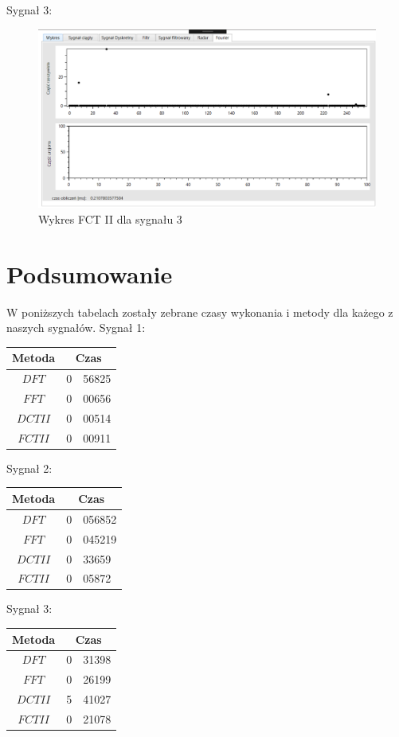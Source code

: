 \documentclass[12pt]{article}
\begin{document}
\newpage
Sygnał 3:
\begin{figure}[h!]
 \centering
 \includegraphics[width=12.3cm]{s18FCT2.PNG}
 \vspace{-0.3cm}
 \caption{Wykres FCT II dla sygnału 3}
 \label{Wykres dla wyników eksperymentu pierwszego}
\end{figure}


\section{Podsumowanie}
W poniższych tabelach zostały zebrane czasy wykonania i metody dla każego z naszych sygnałów.
Sygnał 1:
\begin{tabular}{c r @{,} l}
Metoda &
\multicolumn{2}{c}{Czas}\\ \hline
$DFT$ & 0&56825 \\
$FFT$ & 0&00656 \\
$DCT II$ & 0&00514 \\
$FCT II$ & 0&00911 \\
\end{tabular}

Sygnał 2:
\begin{tabular}{c r @{,} l}
Metoda &
\multicolumn{2}{c}{Czas}\\ \hline
$DFT$ & 0&056852 \\
$FFT$ & 0&045219 \\
$DCT II$ & 0&33659 \\
$FCT II$ & 0&05872 \\
\end{tabular}

Sygnał 3:
\begin{tabular}{c r @{,} l}
Metoda &
\multicolumn{2}{c}{Czas}\\ \hline
$DFT$ & 0&31398 \\
$FFT$ & 0&26199 \\
$DCT II$ & 5&41027 \\
$FCT II$ & 0&21078 \\
\end{tabular}
\end{document}
